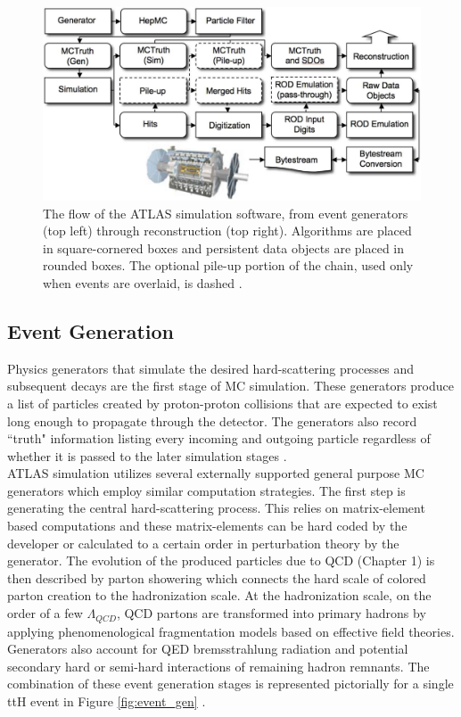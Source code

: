 \begin{figure}[h]
    \centering
    \includegraphics[width=5in]{figures/chapter3/sim_flow.png}
    \caption{The flow of the ATLAS simulation software, from event generators (top left) through reconstruction (top right). Algorithms are placed in square-cornered boxes and persistent data objects are placed in rounded boxes. The optional pile-up portion of the chain, used only when events are overlaid, is dashed \cite{sim_paper}.} 
    \label{fig:sim_flow}
\end{figure}

\subsection{Event Generation}
Physics generators that simulate the desired hard-scattering processes and subsequent decays are the first stage of MC simulation. These generators produce a list of particles created by proton-proton collisions that are expected to exist long enough to propagate through the detector. The generators also record ``truth" information listing every incoming and outgoing particle regardless of whether it is passed to the later simulation stages \cite{sim_paper}.\\

ATLAS simulation utilizes several externally supported general purpose MC generators which employ similar computation strategies. The first step is generating the central hard-scattering process. This relies on matrix-element based computations and these matrix-elements can be hard coded by the developer or calculated to a certain order in perturbation theory by the generator. The evolution of the produced particles due to QCD (Chapter 1) is then described by parton showering which connects the hard scale of colored parton creation to the hadronization scale. At the hadronization scale, on the order of a few $\Lambda_{QCD}$, QCD partons are transformed into primary hadrons by applying phenomenological fragmentation models based on effective field theories. Generators also account for QED bremsstrahlung radiation and potential secondary hard or semi-hard interactions of remaining hadron remnants. The combination of these event generation stages is represented pictorially for a single ttH event in Figure \ref{fig:event_gen} \cite{sherpa_egen}.\\

